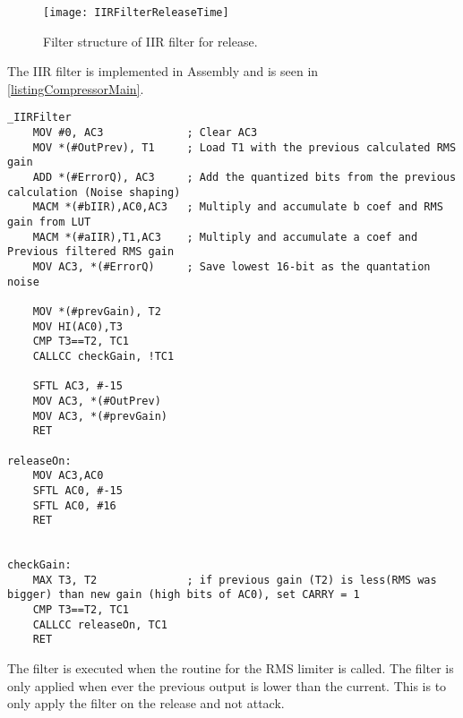 \begin{figure}[H]
\centering
\texttt{[image: IIRFilterReleaseTime]}
\caption{Filter structure of IIR filter for release.}
\label{fig:IIRFilterReleaseTime}
\end{figure}

The IIR filter is implemented in Assembly and is seen in \autoref{listingCompressorMain}. 

\begin{lstlisting}[language={[x86masm]Assembler}, caption = {Release time algorithm.},label={listingCompressorMain}]
_IIRFilter
	MOV #0, AC3				; Clear AC3
	MOV *(#OutPrev), T1		; Load T1 with the previous calculated RMS gain
	ADD *(#ErrorQ), AC3		; Add the quantized bits from the previous calculation (Noise shaping)
	MACM *(#bIIR),AC0,AC3	; Multiply and accumulate b coef and RMS gain from LUT
	MACM *(#aIIR),T1,AC3	; Multiply and accumulate a coef and Previous filtered RMS gain
	MOV AC3, *(#ErrorQ)		; Save lowest 16-bit as the quantation noise
	
	MOV *(#prevGain), T2
	MOV HI(AC0),T3
	CMP T3==T2, TC1
	CALLCC checkGain, !TC1
	
	SFTL AC3, #-15
	MOV AC3, *(#OutPrev)
	MOV AC3, *(#prevGain)
	RET

releaseOn:
	MOV AC3,AC0
	SFTL AC0, #-15
	SFTL AC0, #16
	RET
	

checkGain:
	MAX T3, T2				; if previous gain (T2) is less(RMS was bigger) than new gain (high bits of AC0), set CARRY = 1
	CMP T3==T2, TC1
	CALLCC releaseOn, TC1
	RET
\end{lstlisting}

The filter is executed when the routine for the RMS limiter is called. The filter is only applied when ever the previous output is lower than the current. This is to only apply the filter on the release and not attack. 




